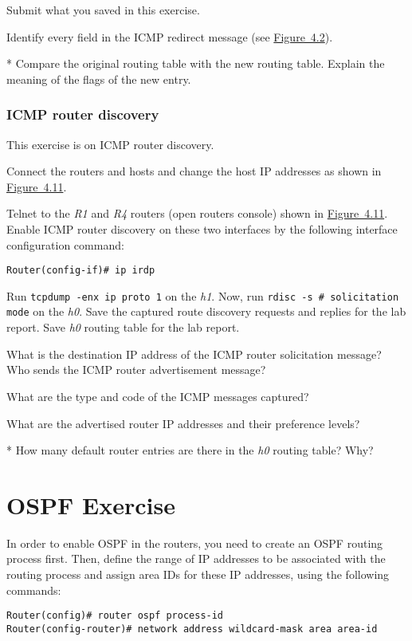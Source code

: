 \documentclass{../UTNetLab}
\begin{document}
    \begin{report}
        \item Submit what you saved in this exercise.
        
        \item Identify every field in the ICMP redirect message (see \hyperref[fig:4.2]{Figure~4.2}).
        
        \item [*] Compare the original routing table with the new routing table.
    Explain the meaning of the flags of the new entry.
    \end{report}

\section{ICMP router discovery}\label{sec:ICMPRD}
    This exercise is on ICMP router discovery.
    
    Connect the routers and hosts and change the host IP addresses as shown in \hyperref[fig:4.11]{Figure~4.11}.
    
    Telnet to the \textit{R1} and \textit{R4} routers (open routers console) shown in \hyperref[fig:4.11]{Figure~4.11}.
    Enable ICMP router discovery on these two interfaces by the following interface configuration command:
    \begin{lstlisting}[language={cisco}]
Router(config-if)# ip irdp
    \end{lstlisting}
    Run \lstinline{tcpdump -enx ip proto 1} on the \textit{h1}.
    Now, run \lstinline{rdisc -s # solicitation mode} on the \textit{h0}.
    Save the captured route discovery requests and replies for the lab report.
    Save \textit{h0} routing table for the lab report.
    
    \begin{report}
        \item What is the destination IP address of the ICMP router solicitation message? Who sends the ICMP router advertisement message?
        \item What are the type and code of the ICMP messages captured?
        \item What are the advertised router IP addresses and their preference levels?
        \item [*] How many default router entries are there in the \textit{h0} routing table? Why?
    \end{report}

\part{OSPF Exercise}\label{sec:ospf}
    In order to enable OSPF in the routers, you need to create an OSPF routing process first.
    Then, define the range of IP addresses to be associated with the routing process and assign area IDs for these IP addresses, using the following commands:
    \begin{lstlisting}[language={cisco}, emph={process-id, area-id, address, wildcard-mask}]
Router(config)# router ospf process-id
Router(config-router)# network address wildcard-mask area area-id
    \end{lstlisting}
    
\end{document}
